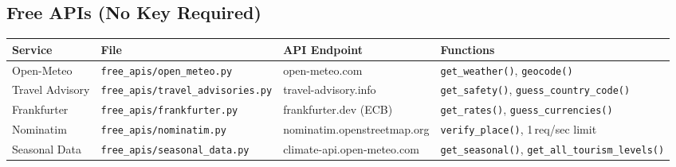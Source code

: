 \documentclass[11pt,a4paper]{article}
\begin{document}
\subsection{Free APIs (No Key Required)}

{\footnotesize
{\small
\begin{tabularx}{\textwidth}{@{}lXXX@{}}
\toprule
\textbf{Service} & \textbf{File} & \textbf{API Endpoint} & \textbf{Functions} \\
\midrule
Open-Meteo      & \texttt{free\_apis/open\_meteo.py}        & open-meteo.com              & \texttt{get\_weather()}, \texttt{geocode()} \\[4pt]
Travel Advisory & \texttt{free\_apis/travel\_advisories.py} & travel-advisory.info        & \texttt{get\_safety()}, \texttt{guess\_country\_code()} \\[4pt]
Frankfurter     & \texttt{free\_apis/frankfurter.py}        & frankfurter.dev (ECB)       & \texttt{get\_rates()}, \texttt{guess\_currencies()} \\[4pt]
Nominatim       & \texttt{free\_apis/nominatim.py}          & nominatim.\allowbreak openstreetmap.org & \texttt{verify\_place()}, 1\,req/sec limit \\[4pt]
Seasonal Data   & \texttt{free\_apis/seasonal\_data.py}     & climate-api.\allowbreak open-meteo.com  & \texttt{get\_seasonal()}, \texttt{get\_all\_tourism\_levels()} \\
\bottomrule
\end{tabularx}}}
\end{document}
